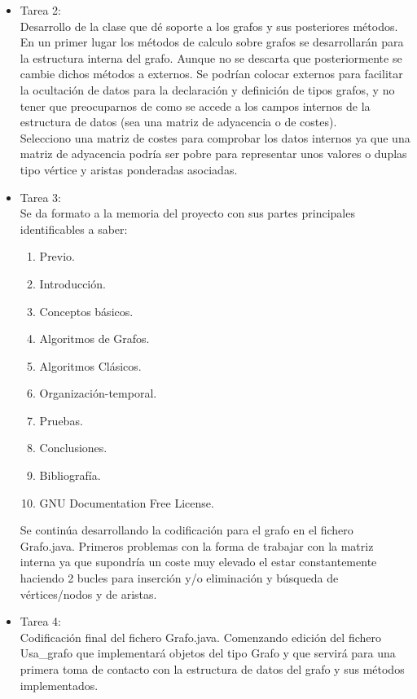 \begin{itemize}
\item Tarea 2:\\

Desarrollo de la clase que dé soporte a los grafos y sus posteriores métodos.\\

En un primer lugar los métodos de calculo sobre grafos se desarrollarán para la estructura interna del grafo. Aunque no se descarta que posteriormente se cambie dichos métodos a externos. Se podrían colocar externos para facilitar la ocultación de datos para la declaración y definición de tipos grafos, y no tener que preocuparnos de como se accede a los campos internos de la estructura de datos (sea una matriz de adyacencia o de costes). \\

Selecciono una matriz de costes para comprobar los datos internos ya que una matriz de adyacencia podría ser pobre para representar unos valores o duplas tipo vértice y aristas ponderadas asociadas.\\

\item Tarea 3:\\

  Se da formato a la memoria del proyecto con sus partes principales identificables a saber:
  \begin{enumerate}
  \item Previo.
  \item Introducción.
  \item Conceptos básicos.
  \item Algoritmos de Grafos.
  \item Algoritmos Clásicos.
  \item Organización-temporal.
  \item Pruebas.
  \item Conclusiones.
  \item Bibliografía.
  \item GNU Documentation Free License.
  \end{enumerate}

Se continúa desarrollando la codificación para el grafo en el fichero Grafo.java. Primeros problemas con la forma de trabajar con la matriz interna ya que supondría un coste muy elevado el estar constantemente haciendo 2 bucles para inserción y/o eliminación y búsqueda de vértices/nodos y de aristas.\\

\item Tarea 4:\\
Codificación final del fichero Grafo.java. Comenzando edición del fichero Usa\_grafo que implementará objetos del tipo Grafo y que servirá para una primera toma de contacto con la estructura de datos del grafo y sus métodos implementados.\\


\end{itemize}
